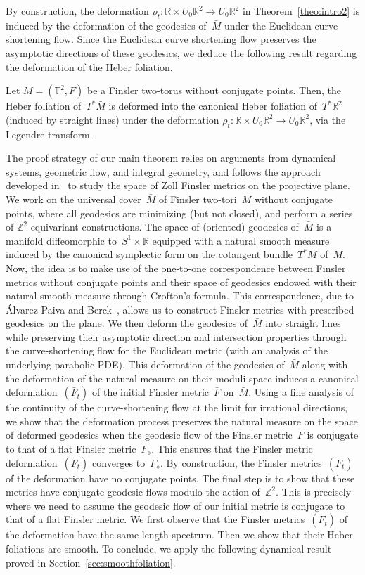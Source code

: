 \documentclass[AHL,Unicode,longabstracts,published]{cedram}
\newcommand{\Z}{\mathbb{Z}}
\newcommand{\R}{\mathbb{R}}
\newcommand{\T}{\mathbb{T}}
\begin{document}
By construction, the deformation $\rho_t:\R \times U_0\R^2 \to U_0\R^2$ in Theorem~\ref{theo:intro2} is induced by the deformation of the geodesics of~$\bar{M}$ under the Euclidean curve shortening flow. Since the Euclidean curve shortening flow preserves the asymptotic directions of these geodesics, we deduce the following result regarding the deformation of the Heber foliation.

\begin{coro}
Let $M=(\T^2,F)$ be a Finsler two-torus without conjugate points. Then, the Heber foliation of~$T^*\bar{M}$ is deformed into the canonical Heber foliation of~$T^*\R^2$ (induced by straight lines) under the deformation \mbox{$\rho_t:\R \times U_0\R^2 \to U_0\R^2$}, via the Legendre transform.
\end{coro}

The proof strategy of our main theorem relies on arguments from dynamical systems, geometric flow, and integral geometry, and follows the approach developed in~\cite{Sa19} to study the space of Zoll Finsler metrics on the projective plane. We work on the universal cover~$\bar{M}$ of Finsler two-tori~$M$ without conjugate points, where all geodesics are minimizing (but not closed), and perform a series of $\Z^2$-equivariant constructions. The space of (oriented) geodesics of~$\bar{M}$ is a manifold diffeomorphic to~$S^1 \times \R$ equipped with a natural smooth measure induced by the canonical symplectic form on the cotangent bundle~$T^*\bar{M}$ of~$\bar{M}$. Now, the idea is to make use of the one-to-one correspondence between Finsler metrics without conjugate points and their space of geodesics endowed with their natural smooth measure through Crofton's formula. This correspondence, due to \'Alvarez Paiva and Berck~\cite{AB}, allows us to construct Finsler metrics with prescribed geodesics on the plane. We then deform the geodesics of~$\bar{M}$ into straight lines while preserving their asymptotic direction and intersection properties through the curve-shortening flow for the Euclidean metric (with an analysis of the underlying parabolic PDE). This deformation of the geodesics of~$\bar{M}$ along with the deformation of the natural measure on their moduli space induces a canonical deformation~$(\bar{F}_t)$ of the initial Finsler metric~$\bar{F}$ on~$\bar{M}$. Using a fine analysis of the continuity of the curve-shortening flow at the limit for irrational directions, we show that the deformation process preserves the natural measure on the space of deformed geodesics when the geodesic flow of the Finsler metric~$F$ is conjugate to that of a flat Finsler metric~$F_\diamond$. This ensures that the Finsler metric deformation~$(\bar{F}_t)$ converges to~$\bar{F}_\diamond$. By construction, the Finsler metrics~$(\bar{F}_t)$ of the deformation have no conjugate points. The final step is to show that these metrics have conjugate geodesic flows modulo the action of~$\Z^2$. This is precisely where we need to assume the geodesic flow of our initial metric is conjugate to that of a flat Finsler metric. We first observe that the Finsler metrics~$(\bar{F}_t)$ of the deformation have the same length spectrum. Then we show that their Heber foliations are smooth. To conclude, we apply the following dynamical result proved in Section~\ref{sec:smoothfoliation}.
\end{document}
